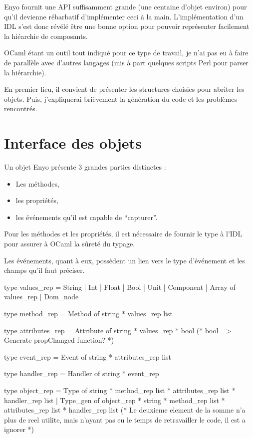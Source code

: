 \documentclass[11pt,a4paper]{report}
\begin{document}
Enyo fournit une API suffisamment grande (une centaine d'objet environ) pour qu'il devienne 
rébarbatif d'implémenter ceci à la main. L'implémentation d'un IDL s'est donc révélé être 
une bonne option pour pouvoir représenter facilement la hiéarchie de composants.

OCaml étant un outil tout indiqué pour ce type de travail, je n'ai pas eu à faire de parallèle 
avec d'autres langages (mis à part quelques scripts Perl pour parser la hiérarchie).

En premier lieu, il convient de présenter les structures choisies pour abriter les objets.
Puis, j'expliquerai brièvement la génération du code et les problèmes rencontrés.

\section{Interface des objets}

Un objet Enyo présente 3 grandes parties distinctes :
\begin{itemize}
  \item Les méthodes,
  \item les propriétés,
  \item les événements qu'il est capable de ``capturer''.
\end{itemize}

Pour les méthodes et les propriétés, il est nécessaire de fournir le type à l'IDL pour assurer à
OCaml la sûreté du typage.

Les événements, quant à eux, possèdent un lien vers le type d'événement et les champs qu'il faut préciser.

\begin{OCaml}
type values_rep =  String | Int | Float | Bool | Unit 
		   | Component | Array of values_rep | Dom_node

type method_rep = Method of string * values_rep list

type attributes_rep = Attribute of string * values_rep * bool (* bool => Generate propChanged function? *)

type event_rep = Event of string * attributes_rep list

type handler_rep = Handler of string * event_rep

type object_rep = Type of string * method_rep list * attributes_rep list * handler_rep list
		  | Type_gen of object_rep * string * method_rep list * attributes_rep list * handler_rep list
                  (* Le deuxieme element de la somme n'a plus de reel utilite, mais n'ayant pas eu le temps
                  de retravailler le code, il est a ignorer *)
\end{OCaml}
\end{document}
